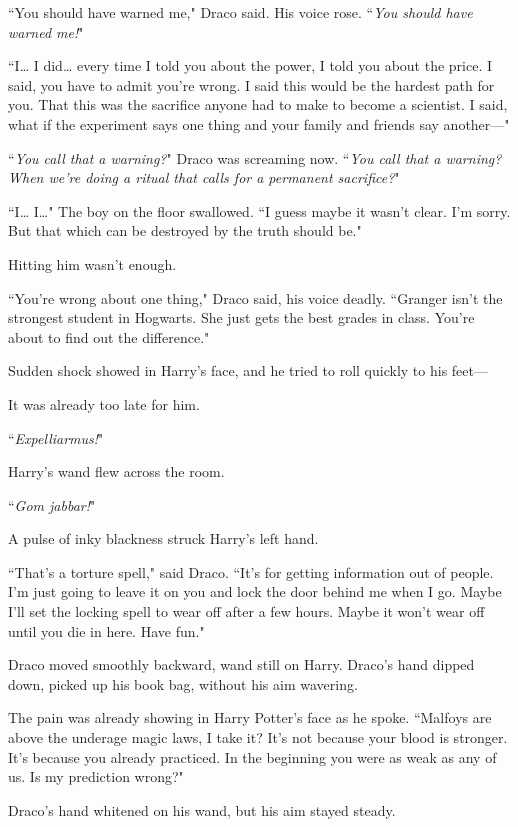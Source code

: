 ``You should have warned me," Draco said. His voice rose. ``\emph{You should have warned me!}"

``I{\ldots} I did{\ldots} every time I told you about the power, I told you about the price. I said, you have to admit you're wrong. I said this would be the hardest path for you. That this was the sacrifice anyone had to make to become a scientist. I said, what if the experiment says one thing and your family and friends say another—"

``\emph{You call that a warning?}" Draco was screaming now. ``\emph{You call that a warning? When we're doing a ritual that calls for a permanent sacrifice?}"

``I{\ldots} I{\ldots}" The boy on the floor swallowed. ``I guess maybe it wasn't clear. I'm sorry. But that which can be destroyed by the truth should be."

Hitting him wasn't enough.

``You're wrong about one thing," Draco said, his voice deadly. ``Granger isn't the strongest student in Hogwarts. She just gets the best grades in class. You're about to find out the difference."

Sudden shock showed in Harry's face, and he tried to roll quickly to his feet—

It was already too late for him.

``\emph{Expelliarmus!}"

Harry's wand flew across the room.

``\emph{Gom jabbar!}"

A pulse of inky blackness struck Harry's left hand.

``That's a torture spell," said Draco. ``It's for getting information out of people. I'm just going to leave it on you and lock the door behind me when I go. Maybe I'll set the locking spell to wear off after a few hours. Maybe it won't wear off until you die in here. Have fun."

Draco moved smoothly backward, wand still on Harry. Draco's hand dipped down, picked up his book bag, without his aim wavering.

The pain was already showing in Harry Potter's face as he spoke. ``Malfoys are above the underage magic laws, I take it? It's not because your blood is stronger. It's because you already practiced. In the beginning you were as weak as any of us. Is my prediction wrong?"

Draco's hand whitened on his wand, but his aim stayed steady.

